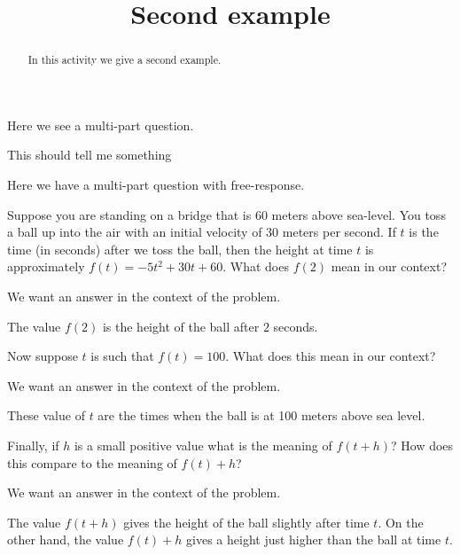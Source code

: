 \documentclass[handout,instructornotes]{ximera}
\title{Second example}
\begin{document}
\begin{abstract}
In this activity we give a second example.
\end{abstract} 
\maketitle
\begin{instructorNotes}
  Here we see a multi-part question.
\end{instructorNotes}

\begin{instructorIntro}
  This should tell me something
\end{instructorIntro}

Here we have a multi-part question with free-response.

\begin{question} 
Suppose you are standing on a bridge that is 60 meters above
sea-level. You toss a ball up into the air with an initial velocity of
30 meters per second.  If $t$ is the time (in seconds) after we toss
the ball, then the height at time $t$ is approximately $f(t) = -5 t^2
+30t+60$. What does $f(2)$ mean in our context?
\begin{hint}
We want an answer in the context of the problem. 
\end{hint}
\begin{freeResponse}
The value $f(2)$ is the height of the ball after $2$ seconds.
\end{freeResponse}
Now suppose $t$ is such that $f(t) = 100$. What does this mean in our
context?
\begin{hint}
We want an answer in the context of the problem. 
\end{hint}
\begin{freeResponse}
These value of $t$ are the times when the ball is at 100 meters above sea level.\end{freeResponse}
Finally, if $h$ is a small positive value what is the meaning of
$f(t+h)$? How does this compare to the meaning of $f(t)+h$?
\begin{hint}
We want an answer in the context of the problem. 
\end{hint}
\begin{freeResponse}
The value $f(t+h)$ gives the height of the ball slightly after time
$t$. On the other hand, the value $f(t)+h$ gives a height just higher
than the ball at time $t$.
\end{freeResponse}
\end{question}
\end{document}
